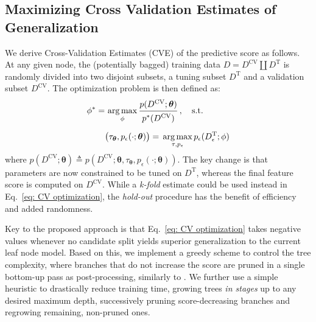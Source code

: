 \subsection{Maximizing Cross Validation Estimates of Generalization}   
\label{sec: CVE}

We derive Cross-Validation Estimates (CVE) of the predictive score as follows. At any given node, the (potentially bagged) training data $D=D^{\text{CV}}\!\coprod\! D^{\text{T}}$ is randomly divided into two disjoint subsets, 
a tuning subset $D^{\text{T}}$ and a validation subset $D^{\text{CV}}$. The optimization problem is then defined as:
\begin{equation}
\begin{split}
\phi^\ast = & \,\argmax_{\phi} \cfrac{p(D^{\text{CV}};\bm{\theta})}{\raisebox{-0.5ex}{$p^\ast(D^{\text{CV}})$}} \; , \quad \text{s.t. }\\[\medskipamount]
& \big(\tau_{\bm{\theta}}, p_\epsilon(\cdot;\bm{\theta})\big) = \,\argmax_{\tau, p_\epsilon} p_\epsilon(D_\epsilon^{\text{T}};\phi)
\end{split}
\label{eq: CV optimization}
\end{equation}
where $p(D^{\text{CV}};\bm{\theta})\!\triangleq\! p(D^{\text{CV}};\bm{\theta}, \tau_{\bm{\theta}}, p_\epsilon(\cdot;\bm{\theta}))$. The key change is that parameters are now constrained to be tuned on $D^{\text{T}}$, whereas the final feature score is computed on $D^{\text{CV}}$. While a \textit{k-fold} estimate could be used instead in Eq.~\eqref{eq: CV optimization}, the \textit{hold-out} procedure has the benefit of efficiency and added randomness. 


Key to the proposed approach is that Eq.~\eqref{eq: CV optimization} takes negative values whenever no candidate split 
yields superior generalization to the current leaf node model. Based on this, we implement a greedy scheme to control the tree complexity, where branches that do not increase the score are pruned in a single bottom-up pass as post-processing, similarly to \cite{quinlan1987simplifying}. We further use a simple heuristic to drastically reduce training time, growing trees \textit{in stages} up to any desired maximum depth, successively pruning score-decreasing branches and regrowing remaining, non-pruned ones.
